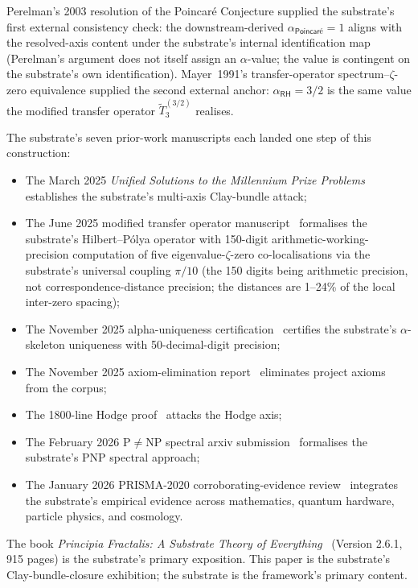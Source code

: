 \documentclass[11pt,a4paper]{amsart}
\theoremstyle{plain}
\theoremstyle{definition}
\begin{document}
Perelman's 2003 resolution of the Poincar\'e Conjecture supplied the substrate's first external consistency check: the downstream-derived $\alpha_{\textsf{Poincar\'e}}=1$ aligns with the resolved-axis content under the substrate's internal identification map (Perelman's argument does not itself assign an $\alpha$-value; the value is contingent on the substrate's own identification). Mayer~1991's transfer-operator spectrum--$\zeta$-zero equivalence supplied the second external anchor: $\alpha_{\textsf{RH}}=3/2$ is the same value the modified transfer operator $\widetilde{T}_3^{(3/2)}$ realises.

The substrate's seven prior-work manuscripts each landed one step of this construction:
\begin{itemize}[itemsep=2pt]
\item The March 2025 \emph{Unified Solutions to the Millennium Prize Problems}~\cite{cohen2025unifiedClay} establishes the substrate's multi-axis Clay-bundle attack;
\item The June 2025 modified transfer operator manuscript~\cite{cohen2025transferOp} formalises the substrate's Hilbert--P\'olya operator with 150-digit arithmetic-working-precision computation of five eigenvalue-$\zeta$-zero co-localisations via the substrate's universal coupling $\pi/10$ (the 150 digits being arithmetic precision, not correspondence-distance precision; the distances are 1--24\% of the local inter-zero spacing);
\item The November 2025 alpha-uniqueness certification~\cite{cohen2025alphaUniqueness} certifies the substrate's $\alpha$-skeleton uniqueness with 50-decimal-digit precision;
\item The November 2025 axiom-elimination report~\cite{cohen2025axiomElim} eliminates project axioms from the corpus;
\item The 1800-line Hodge proof~\cite{cohen2025hodgeProof} attacks the Hodge axis;
\item The February 2026 P$\neq$NP spectral arxiv submission~\cite{cohen2026pnpSpectral} formalises the substrate's PNP spectral approach;
\item The January 2026 PRISMA-2020 corroborating-evidence review~\cite{cohen2026corroborating} integrates the substrate's empirical evidence across mathematics, quantum hardware, particle physics, and cosmology.
\end{itemize}

The book \emph{Principia Fractalis: A Substrate Theory of Everything}~\cite{cohen2026book} (Version 2.6.1, 915 pages) is the substrate's primary exposition. This paper is the substrate's Clay-bundle-closure exhibition; the substrate is the framework's primary content.
\end{document}
